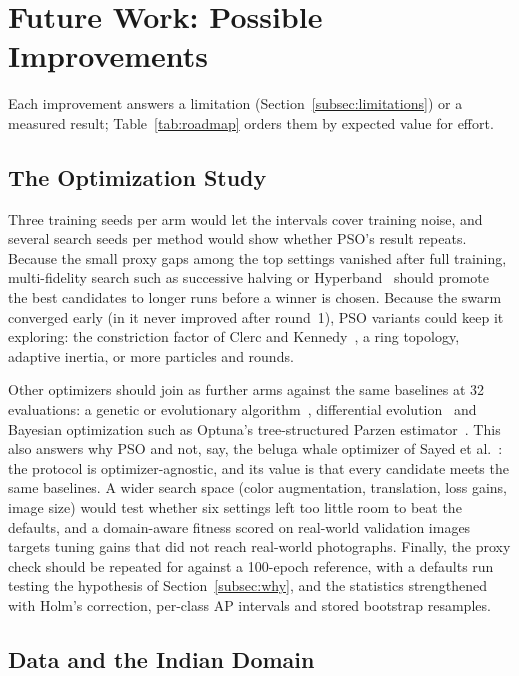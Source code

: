 \section{Future Work: Possible Improvements}
\label{sec:future}

Each improvement answers a limitation (Section~\ref{subsec:limitations}) or a measured result; Table~\ref{tab:roadmap} orders them by expected value for effort.

\subsection{The Optimization Study}
\label{subsec:fw-opt}

Three training seeds per arm would let the intervals cover training noise, and several search seeds per method would show whether PSO's result repeats. Because the small proxy gaps among the top settings vanished after full training, multi-fidelity search such as successive halving or Hyperband~\cite{li2018hyperband} should promote the best candidates to longer runs before a winner is chosen. Because the swarm converged early (in \gentwo it never improved after round~1), PSO variants could keep it exploring: the constriction factor of Clerc and Kennedy~\cite{clerc2002particle}, a ring topology, adaptive inertia, or more particles and rounds.

Other optimizers should join as further arms against the same baselines at 32 evaluations: a genetic or evolutionary algorithm~\cite{young2015optimizing}, differential evolution~\cite{storn1997differential} and Bayesian optimization such as Optuna's tree-structured Parzen estimator~\cite{akiba2019optuna}. This also answers why PSO and not, say, the beluga whale optimizer of Sayed et al.~\cite{sayed2024intelligent}: the protocol is optimizer-agnostic, and its value is that every candidate meets the same baselines. A wider search space (color augmentation, translation, loss gains, image size) would test whether six settings left too little room to beat the defaults, and a domain-aware fitness scored on real-world validation images targets tuning gains that did not reach real-world photographs. Finally, the proxy check should be repeated for \gentwo against a 100-epoch reference, with a defaults run testing the hypothesis of Section~\ref{subsec:why}, and the statistics strengthened with Holm's correction, per-class AP intervals and stored bootstrap resamples.

\subsection{Data and the Indian Domain}
\label{subsec:fw-data}

